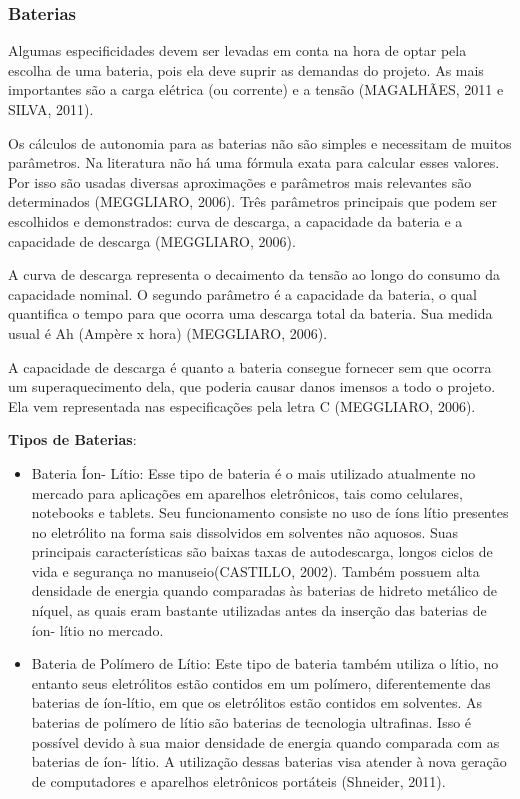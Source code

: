 \subsubsection{Baterias}

Algumas especificidades devem ser levadas em conta na hora de optar pela escolha de uma bateria, pois ela deve suprir as demandas do projeto. As mais importantes são a carga elétrica (ou corrente) e a tensão (MAGALHÃES, 2011 e SILVA, 2011).

Os cálculos de autonomia para as baterias não são simples e necessitam de muitos parâmetros. Na literatura não há uma fórmula exata para calcular esses valores. Por isso são usadas diversas aproximações e parâmetros mais relevantes são determinados (MEGGLIARO, 2006).
Três parâmetros principais que podem ser escolhidos e demonstrados: curva de descarga, a capacidade da bateria e a capacidade de descarga (MEGGLIARO, 2006). 

A curva de descarga representa o decaimento da tensão ao longo do consumo da capacidade nominal. O segundo parâmetro é a capacidade da bateria, o qual quantifica o tempo para que ocorra uma descarga total da bateria. Sua medida usual é Ah (Ampère x hora) (MEGGLIARO, 2006).  

A capacidade de descarga é quanto a bateria consegue fornecer sem que ocorra um superaquecimento dela, que poderia causar danos imensos a todo o projeto. Ela vem representada nas especificações pela letra C (MEGGLIARO, 2006).

\textbf{Tipos de Baterias}:

\begin{itemize}
	\item Bateria Íon- Lítio: Esse tipo de bateria é o mais utilizado atualmente no mercado para aplicações em aparelhos eletrônicos, tais como celulares, notebooks e tablets. Seu funcionamento consiste no uso de íons lítio presentes no eletrólito na forma sais dissolvidos em solventes não aquosos. Suas principais características são baixas taxas de autodescarga, longos ciclos de vida e segurança no manuseio(CASTILLO, 2002). Também possuem alta densidade de energia quando comparadas às baterias de hidreto metálico de níquel, as quais eram bastante utilizadas antes da inserção das baterias de íon- lítio no mercado.
	\item Bateria de Polímero de Lítio: Este tipo de bateria também utiliza o lítio, no entanto seus eletrólitos estão contidos em um polímero, diferentemente das baterias de íon-lítio, em que os eletrólitos estão contidos em solventes. As baterias de polímero de lítio são baterias de tecnologia ultrafinas. Isso é possível devido à sua maior densidade de energia quando comparada com as baterias de íon- lítio. A utilização dessas baterias visa atender à nova geração de computadores e aparelhos eletrônicos portáteis (Shneider, 2011).
\end{itemize}


